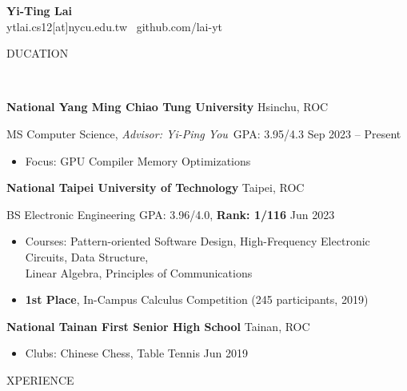 \documentclass[11pt]{article}
\begin{document}
\begin{center}
    \textbf{Yi-Ting Lai}\\
    ytlai.cs12[at]nycu.edu.tw \textbullet \ github.com/lai-yt
\end{center}

\vspace{0.5pt}

\begin{center}
    \scalebox{1.3}{E}DUCATION\raggedright \,\hrulefill
\end{center}

\textbf{National Yang Ming Chiao Tung University} \hfill Hsinchu, ROC

MS Computer Science, \textit{Advisor: Yi-Ping You} \,\qquad GPA: 3.95/4.3 \hfill Sep 2023 – Present

\begin{itemize}[noitemsep, topsep=0pt, partopsep=0pt, parsep=0pt, leftmargin=*]
    \item Focus: GPU Compiler Memory Optimizations
\end{itemize}

\vspace{6pt}

\textbf{National Taipei University of Technology} \hfill Taipei, ROC

BS Electronic Engineering \enskip \qquad \qquad \qquad \qquad \qquad GPA: 3.96/4.0, \textbf{Rank: 1/116} \hfill Jun 2023
\begin{itemize}[noitemsep, topsep=0pt, partopsep=0pt, parsep=0pt, leftmargin=*]
    \item Courses: Pattern-oriented Software Design, High-Frequency Electronic Circuits, Data Structure,\\Linear Algebra, Principles of Communications
    \item \textbf{1st Place}, In-Campus Calculus Competition (245 participants, 2019)
\end{itemize}

\vspace{6pt}

\textbf{National Tainan First Senior High School} \hfill    Tainan, ROC

\begin{itemize}[noitemsep, topsep=0pt, partopsep=0pt, parsep=0pt, leftmargin=*]
    \item Clubs: Chinese Chess, Table Tennis \hfill Jun 2019
\end{itemize}

\begin{center}
    \scalebox{1.3}{E}XPERIENCE\raggedright \,\hrulefill
\end{center}
\end{document}
